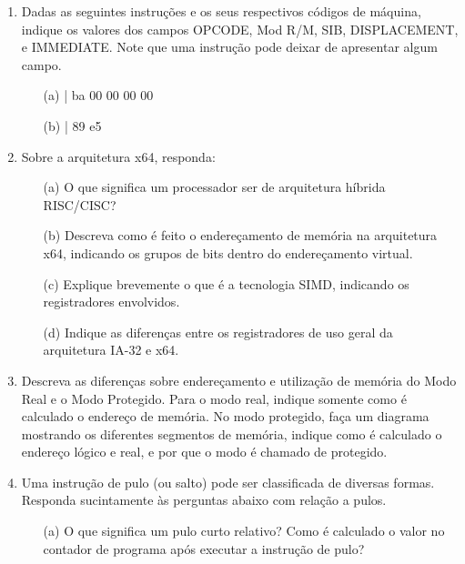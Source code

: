 \begin{enumerate}

    \item 
    Dadas as seguintes instruções e os seus respectivos códigos de máquina,
    indique os valores dos campos OPCODE, Mod R/M, SIB, DISPLACEMENT, e IMMEDIATE.
    Note que uma instrução pode deixar de apresentar algum campo.
    \begin{itemize}
        \item [(a)]  | ba 00 00 00 00
        \item [(b)]  | 89 e5
    \end{itemize}

    \item
    Sobre a arquitetura x64, responda:
    \begin{itemize}
        \item [(a)]
        O que significa um processador ser de arquitetura híbrida RISC/CISC?

        \item [(b)]
        Descreva como é feito o endereçamento de memória na arquitetura x64,
        indicando os grupos de bits dentro do endereçamento virtual.

        \item [(c)]
        Explique brevemente o que é a tecnologia SIMD,
        indicando os registradores envolvidos.

        \item [(d)]
        Indique as diferenças entre os registradores 
        de uso geral da arquitetura IA-32 e x64.    
    \end{itemize}

    \item
    Descreva as diferenças sobre endereçamento e utilização de memória 
    do Modo Real e o Modo Protegido. 
    Para o modo real, indique somente como é calculado o endereço de memória.
    No modo protegido, 
    faça um diagrama mostrando os diferentes segmentos de memória,
    indique como é calculado o endereço lógico e real, 
    e por que o modo é chamado de protegido.

    \item
    Uma instrução de pulo (ou salto) pode ser classificada de diversas formas.
    Responda sucintamente às perguntas abaixo com relação a pulos.
    \begin{itemize}
        \item [(a)]
        O que significa um pulo curto relativo? 
        Como é calculado o valor no contador de programa 
        após executar a instrução de pulo?


\end{itemize}
\end{enumerate}
